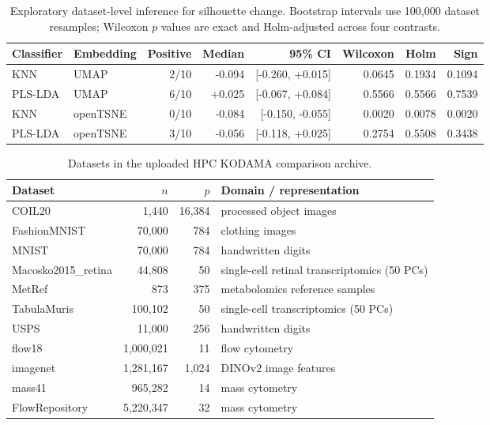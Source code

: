 \documentclass[twoside,11pt]{article}
\begin{document}
\begin{small}
\begin{table}[h]
\centering\scriptsize
\caption{Exploratory dataset-level inference for silhouette change. Bootstrap intervals use 100,000 dataset resamples; Wilcoxon $p$ values are exact and Holm-adjusted across four contrasts.}
\begin{tabular}{llrrrrrr}
\toprule
Classifier & Embedding & Positive & Median & 95\% CI & Wilcoxon & Holm & Sign \\
\midrule
KNN & UMAP & 2/10 & -0.094 & [-0.260, +0.015] & 0.0645 & 0.1934 & 0.1094 \\
PLS-LDA & UMAP & 6/10 & +0.025 & [-0.067, +0.084] & 0.5566 & 0.5566 & 0.7539 \\
KNN & openTSNE & 0/10 & -0.084 & [-0.150, -0.055] & 0.0020 & 0.0078 & 0.0020 \\
PLS-LDA & openTSNE & 3/10 & -0.056 & [-0.118, +0.025] & 0.2754 & 0.5508 & 0.3438 \\
\bottomrule
\end{tabular}
\end{table}
\begin{table}[h]
\caption{Datasets in the uploaded HPC KODAMA comparison archive.}
\small
\begin{tabularx}{\linewidth}{lrrX}
\toprule
Dataset & $n$ & $p$ & Domain / representation \\
\midrule
COIL20 & 1,440 & 16,384 & processed object images \\
FashionMNIST & 70,000 & 784 & clothing images \\
MNIST & 70,000 & 784 & handwritten digits \\
Macosko2015\_retina & 44,808 & 50 & single-cell retinal transcriptomics (50 PCs) \\
MetRef & 873 & 375 & metabolomics reference samples \\
TabulaMuris & 100,102 & 50 & single-cell transcriptomics (50 PCs) \\
USPS & 11,000 & 256 & handwritten digits \\
flow18 & 1,000,021 & 11 & flow cytometry \\
imagenet & 1,281,167 & 1,024 & DINOv2 image features \\
mass41 & 965,282 & 14 & mass cytometry \\
FlowRepository & 5,220,347 & 32 & mass cytometry \\
\bottomrule
\end{tabularx}
\end{table}


\end{small}
\end{document}
